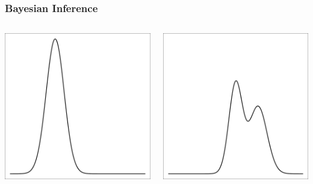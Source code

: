 \documentclass{beamer}
\begin{document}
\begin{frame}[t]
    \frametitle{Bayesian Inference}
    \begin{columns}[c]
            \begin{flushright}
                \includegraphics[width=1\textwidth]{bayesian_update_illustration_th1.pdf}
            \end{flushright}
            \begin{flushright}
                \includegraphics[width=1\textwidth]{bayesian_update_illustration_th2.pdf}

\end{flushright}
\end{columns}
\end{frame}
\end{document}
